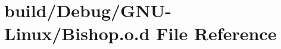 \hypertarget{_g_n_u-_linux_2_bishop_8o_8d}{}\section{build/\+Debug/\+G\+N\+U-\/\+Linux/\+Bishop.o.\+d File Reference}
\label{_g_n_u-_linux_2_bishop_8o_8d}
